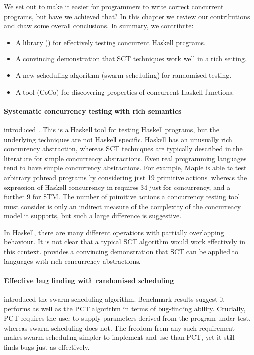 We set out to make it easier for programmers to write correct
concurrent programs, but have we achieved that?  In this chapter we
review our contributions and draw some overall conclusions.  In
summary, we contribute:

\begin{itemize}
\item A library (\dejafu{}) for effectively testing concurrent Haskell
  programs.
\item A convincing demonstration that SCT techniques work well in a
  rich setting.
\item A new scheduling algorithm (swarm scheduling) for randomised
  testing.
\item A tool (CoCo) for discovering properties of concurrent Haskell
  functions.
\end{itemize}

\paragraph{Systematic concurrency testing with rich semantics}
 introduced \dejafu{}.  This is a Haskell tool for
testing Haskell programs, but the underlying techniques are not
Haskell specific.  Haskell has an unusually rich concurrency
abstraction, whereas SCT techniques are typically described in the
literature for simple concurrency abstractions.  Even real programming
languages tend to have simple concurrency abstractions.  For example,
Maple\cite{yu2012} is able to test arbitrary pthread programs by
considering just 19 primitive actions, whereas the expression of
Haskell concurrency in \dejafu{} requires 34 just for concurrency, and
a further 9 for STM.  The number of primitive actions a concurrency
testing tool must consider is only an indirect measure of the
complexity of the concurrency model it supports, but such a large
difference is suggestive.

In Haskell, there are many different operations with partially
overlapping behaviour.  It is not clear that a typical SCT algorithm
would work effectively in this context.  \dejafu{} provides a
convincing demonstration that SCT can be applied to languages with
rich concurrency abstractions.

\paragraph{Effective bug finding with randomised scheduling}
 introduced the swarm scheduling algorithm.
Benchmark results suggest it performs as well as the PCT
algorithm\cite{burckhardt2010} in terms of bug-finding ability.
Crucially, PCT requires the user to supply parameters derived from the
program under test, whereas swarm scheduling does not.  The freedom
from any such requirement makes swarm scheduling simpler to implement
and use than PCT, yet it still finds bugs just as effectively.

